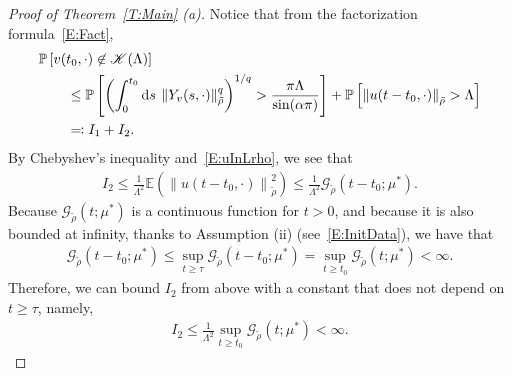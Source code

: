 \documentclass[sn-mathphys]{sn-jnl}%
\newcommand{\Norm}[1]{\left\| #1 \right\|}
\newcommand{\ud}{\ensuremath{\mathrm{d}}}
\numberwithin{equation}{section}
\theoremstyle{thmstyleone}%
\theoremstyle{thmstyletwo}%
\theoremstyle{thmstylethree}%
\begin{document}
\begin{proof}[Proof of Theorem~\ref{T:Main} (a)]
  Notice that from the factorization formula~\eqref{E:Fact},
  \begin{align*}
    \MoveEqLeft
    \mathbb{P} \left[ v(t_0,\cdot) \not \in \mathscr{K}(\Lambda) \right ]\\
    & \le \mathbb{P}\left[ \left(\int_{0}^{t_0} \ud s\: \Norm{Y_v(s,\cdot)}_{\tilde{\rho}}^q \right)^{1/q} > \dfrac{\pi \Lambda}{\sin(\alpha \pi )} \right]
    + \mathbb{P}\left[ \Norm{u(t-t_0,\cdot)}_{\tilde{\rho}} > \Lambda \right] \\
    & \eqqcolon I_1+I_2.
  \end{align*}
  By Chebyshev's inequality and~\eqref{E:uInLrho}, we see that
  \begin{align*}
    I_2\le\frac{1}{\Lambda^2} \mathbb{E}\left(\Norm{u(t-t_0,\cdot)}_{\tilde{\rho}}^2\right)
    \le \frac{1}{\Lambda^2} \mathcal{G}_{\tilde{\rho}}\left(t-t_0;\mu^*\right).
  \end{align*}
  Because $\mathcal{G}_{\tilde{\rho}}(t;\mu^*)$ is a continuous function for $t>0$, and because it
  is also bounded at infinity, thanks to Assumption (ii) (see~\eqref{E:InitData}), we have that
  \begin{align}\label{E:GtBdd}
    \mathcal{G}_{\tilde{\rho}}\left(t-t_0;\mu^*\right)
    \le \sup_{t\ge \tau} \mathcal{G}_{\tilde{\rho}}\left(t-t_0;\mu^*\right)
    = \sup_{t\ge t_0} \mathcal{G}_{\tilde{\rho}}\left(t;\mu^*\right)<\infty.
  \end{align}
  Therefore, we can bound $I_2$ from above with a constant that does not depend on $t\ge \tau$,
  namely,
  \begin{align*}
    I_2 \le\frac{1}{\Lambda^2} \sup_{t\ge t_0} \mathcal{G}_{\tilde{\rho}}\left(t;\mu^*\right)<\infty.
  \end{align*}


\end{proof}
\end{document}
